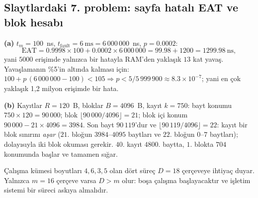\subsection{Slaytlardaki 7. problem: sayfa hatalı EAT ve blok hesabı}
\textbf{(a)} $t_m = 100$~ns, $t_{\text{fault}} = 6\ \text{ms} = 6\,000\,000$~ns, $p = 0.0002$:
\[
\text{EAT} = 0.9998 \times 100 + 0.0002 \times 6\,000\,000 = 99.98 + 1200 = 1299.98\ \text{ns},
\]
yani $5000$ erişimde yalnızca bir hatayla RAM'den yaklaşık $13$ kat yavaş. Yavaşlamanın \%5'in altında kalması için: $100 + p\,(6\,000\,000 - 100) < 105 \Rightarrow p < 5/5\,999\,900 \approx 8.3\times10^{-7}$; yani en çok yaklaşık 1,2 milyon erişimde bir hata.

\textbf{(b)} Kayıtlar $R = 120$~B, bloklar $B = 4096$~B, kayıt $k = 750$: bayt konumu $750 \times 120 = 90\,000$; blok $\lfloor 90\,000/4096\rfloor = 21$; blok içi konum $90\,000 - 21 \times 4096 = 3984$. Son bayt $90\,119$'dur ve $\lfloor 90\,119/4096\rfloor = 22$: kayıt bir blok sınırını \emph{aşar} ($21$. bloğun $3984$--$4095$ baytları ve $22$. bloğun $0$--$7$ baytları); dolayısıyla iki blok okuması gerekir. $40$. kayıt $4800$. baytta, $1$. blokta $704$ konumunda başlar ve tamamen sığar.

\begin{example}
Çalışma kümesi boyutları $4, 6, 3, 5$ olan dört süreç $D = 18$ çerçeveye ihtiyaç duyar. Yalnızca $m = 16$ çerçeve varsa $D > m$ olur: boşa çalışma başlayacaktır ve işletim sistemi bir süreci askıya almalıdır.
\end{example}

